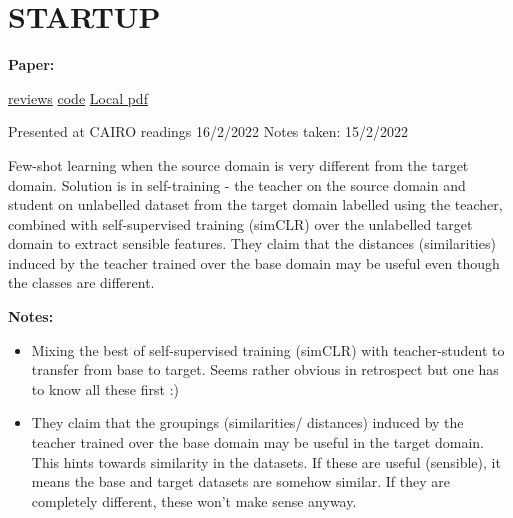 \clearpage

\section{STARTUP}\label{sec:startup}

\begin{notebox}
\textbf{Paper: } 
\vspace{5pt}

\href{https://openreview.net/forum?id=O3Y56aqpChA}{reviews}
\hspace{1cm}
\href{https://github.com/cpphoo/STARTUP}{code}
\hspace{1cm}
\href{run:/home/magda/Dropbox/Zot/Phoo_Hariharan_2021_Self-training for Few-shot Transfer Across Extreme Task Differences.pdf}{Local pdf}
\vspace{3pt}

Presented at CAIRO readings 16/2/2022
\hfill Notes taken: 15/2/2022 
\end{notebox}

\begin{notebox}[colback=red!5]
\tldr Few-shot learning when the source domain is very different from the target domain. Solution is in self-training - the teacher on the source domain and student on unlabelled dataset from the target domain labelled using the teacher, combined with self-supervised training (simCLR) over the unlabelled target domain to extract sensible features. They claim that the distances (similarities) induced by the teacher trained over the base domain may be useful even though the classes are different.
\end{notebox}

\begin{notebox}[colback=yellow!5]
\textbf{Notes:} 
\begin{itemize}[nosep]
\item Mixing the best of self-supervised training (simCLR) with teacher-student to transfer from base to target. Seems rather obvious in retrospect but one has to know all these first :)
\item They claim that the groupings (similarities/ distances) induced by the teacher trained over the base domain may be useful in the target domain. This hints towards similarity in the datasets. If these are useful (sensible), it means the base and target datasets are somehow similar. If they are completely different, these won't make sense anyway.
\end{itemize}
\end{notebox}

